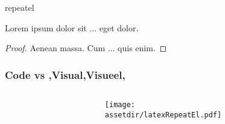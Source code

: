\begin{saveblock}{repeatel}
    \begin{highlightblock}[linewidth=0.5\textwidth,gobble=8]
        \begin{lemma}
            Lorem ipsum dolor sit
            ... eget dolor.
            
            \begin{proof}
                Aenean massa. Cum
                ... quis enim.
            \end{proof}
        \end{lemma}
    \end{highlightblock}
\end{saveblock}

\begin{frame}
    \frametitle{Code vs \lang,Visual,Visueel,}
    \begin{columns}
        \begin{column}{0.5\textwidth}
        \end{column}
        \begin{column}{0.5\textwidth}
            \texttt{[image: \\assetdir/latexRepeatEl.pdf]}
        \end{column}
    \end{columns}
\end{frame}
